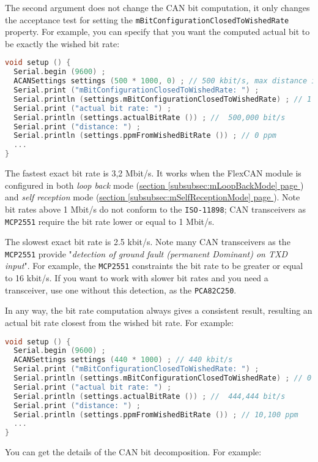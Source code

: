\documentclass[10pt, a4paper, obeyspaces, openany]{extarticle}
\newcommand\refSubsubsectionPage[1]{\hyperref[subsubsec:#1]{section \ref*{subsubsec:#1} page \pageref{subsubsec:#1}}}
\begin{document}
The second argument does not change the CAN bit computation, it only changes the acceptance test for setting the \texttt{mBitConfigurationClosedToWishedRate} property. For example, you can specify that you want the computed actual bit to be exactly the wished bit rate:
{ \small\begin{lstlisting}[language=c++]
void setup () {
  Serial.begin (9600) ;
  ACANSettings settings (500 * 1000, 0) ; // 500 kbit/s, max distance is 0 ppm
  Serial.print ("mBitConfigurationClosedToWishedRate: ") ;
  Serial.println (settings.mBitConfigurationClosedToWishedRate) ; // 1 (--> is true)
  Serial.print ("actual bit rate: ") ;
  Serial.println (settings.actualBitRate ()) ; //  500,000 bit/s
  Serial.print ("distance: ") ;
  Serial.println (settings.ppmFromWishedBitRate ()) ; // 0 ppm
  ...
}
\end{lstlisting}}

The fastest exact bit rate is 3,2 Mbit/s. It works when the FlexCAN module is configured in both \emph{loop back} mode (\refSubsubsectionPage{mLoopBackMode}) and \emph{self reception} mode (\refSubsubsectionPage{mSelfReceptionMode}). Note bit rates above 1 Mbit/s do not conform to the \texttt{ISO-11898}; CAN transceivers as \texttt{MCP2551} require the bit rate lower or equal to 1 Mbit/s.


The slowest exact bit rate is 2.5 kbit/s. Note many CAN transceivers as the \texttt{MCP2551} provide "\emph{detection of ground fault (permanent Dominant) on TXD input}". For example, the \texttt{MCP2551} constraints the bit rate to be greater or equal to 16 kbit/s. If you want to work with slower bit rates and you need a transceiver, use one without this detection, as the \texttt{PCA82C250}.


In any way, the bit rate computation always gives a consistent result, resulting an actual bit rate closest from the wished bit rate. For example:
{ \small\begin{lstlisting}[language=c++]
void setup () {
  Serial.begin (9600) ;
  ACANSettings settings (440 * 1000) ; // 440 kbit/s 
  Serial.print ("mBitConfigurationClosedToWishedRate: ") ;
  Serial.println (settings.mBitConfigurationClosedToWishedRate) ; // 0 (--> is false)
  Serial.print ("actual bit rate: ") ;
  Serial.println (settings.actualBitRate ()) ; //  444,444 bit/s
  Serial.print ("distance: ") ;
  Serial.println (settings.ppmFromWishedBitRate ()) ; // 10,100 ppm
  ...
}
\end{lstlisting}}

You can get the details of the CAN bit decomposition. For example:
\end{document}
